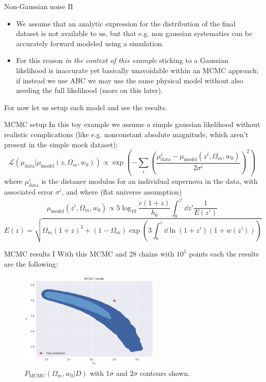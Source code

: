 \documentclass{beamer}
\newcommand{\tonde}[1]{\left( {#1} \right)}
\theoremstyle{remark}
\newcommand{\nologo}{\setbeamertemplate{logo}{}} %
\renewcommand{\L}{\mathcal{L}}
\begin{document}
\begin{frame}{Non-Gaussian noise II}
\begin{itemize}[<+->]
    \item We assume that an analytic expression for the distribution of the final dataset is not available to us, but that e.g. non gaussian systematics can be accurately forward modeled using a simulation.
    \item For this reason \emph{in the context of this example} sticking to a Gaussian likelihood is inaccurate yet basically unavoidable within an MCMC approach; if instead we use ABC we may use the same physical model without also needing the full likelihood (more on this later).
\end{itemize}
\pause[\thebeamerpauses]
For now let us setup each model and see the results.
\end{frame}
{\nologo
\begin{frame}{MCMC setup}
In this toy example we assume a simple gaussian likelihood without realistic complications (like e.g. nonconstant absolute magnitude, which aren't present in the simple mock dataset):
\begin{equation*}
    \L(\mu_{\text{data}}|\mu_{\text{model}}(z, \Omega_m, w_0))\propto \exp(-\sum_i \tonde{\frac{\mu_{\text{data}}^i - \mu_{\text{model}}(z^i, \Omega_m, w_0)}{2\sigma^i}}^2 )
\end{equation*}
where $\mu_{\text{data}}^i$ is the distance modulus for an individual supernova in the data, with associated error $\sigma^i$, and where (flat universe assumption)
\begin{equation*}
    \mu_{\text{model}}(z^i, \Omega_m, w_0)\propto 5\log_{10}\frac{c(1+z)}{h_0}\int_0^{z^i}\dd{z'}\frac{1}{E(z')}
\end{equation*}
\begin{equation*}
    E(z) = \sqrt{\Omega_m (1+z)^3 + (1-\Omega_m)\exp(3\int_0^z\dd{\ln(1+z')}(1+w(z')))}
\end{equation*}
\end{frame}
}

\begin{frame}{MCMC results I}
With this MCMC and 28 chains with $10^5$ points each the results are the following:
\begin{figure}[H]
    \centering
    \includegraphics[width=0.6\textwidth]{astroabc_mcmc_results.png}
    \caption{$P_{\text{MCMC}}(\Omega_m, w_0|D)$ with $1\sigma$ and $2\sigma$ contours shown.}
\end{figure}
\end{frame}
\end{document}
